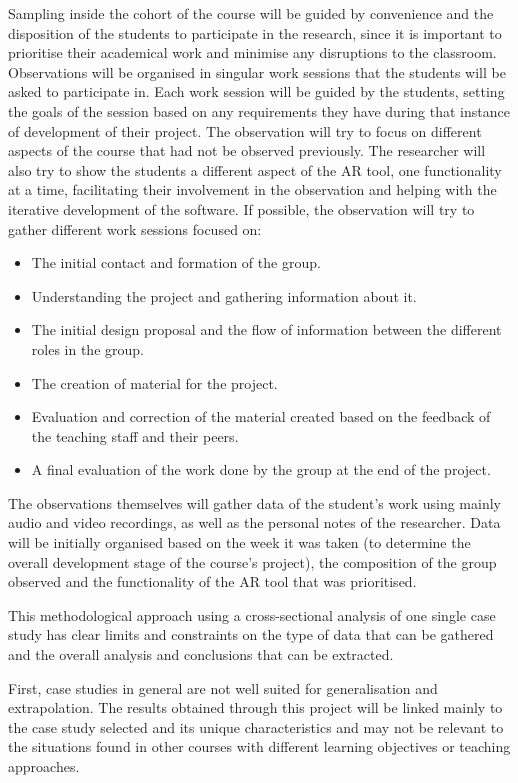 Sampling inside the cohort of the course will be guided by convenience and the disposition of the students to participate in the research, since it is important to
prioritise their academical work and minimise any disruptions to the classroom. Observations will be organised in singular work sessions that the students will be asked to
participate in. Each work session will be guided by the students, setting the goals of the session based on any requirements they have during that instance of development
of their project. The observation will try to focus on different aspects of the course that had not be observed previously. The researcher will also try to show the
students a different aspect of the \ac{AR} tool, one functionality at a time, facilitating their involvement in the observation and helping with the iterative development
of the software. If possible, the observation will try to gather different work sessions focused on:

\begin{itemize}
    \item The initial contact and formation of the group.
    \item Understanding the project and gathering information about it.
    \item The initial design proposal and the flow of information between the different roles in the group.
    \item The creation of material for the project.
    \item Evaluation and correction of the material created based on the feedback of the teaching staff and their peers.
    \item A final evaluation of the work done by the group at the end of the project.
\end{itemize}

The observations themselves will gather data of the student's work using mainly audio and video recordings, as well as the personal notes of the researcher. Data will be initially
organised based on the week it was taken (to determine the overall development stage of the course's project), the composition of the group observed and the functionality
of the \ac{AR} tool that was prioritised.

This methodological approach using a cross-sectional analysis of one single case study has clear limits and constraints on the type of data that can be gathered and the overall
analysis and conclusions that can be extracted.

First, case studies in general are not well suited for generalisation and extrapolation. The results obtained through this project will be linked mainly to the case study selected
and its unique characteristics and may not be relevant to the situations found in other courses with different learning objectives or teaching approaches.

